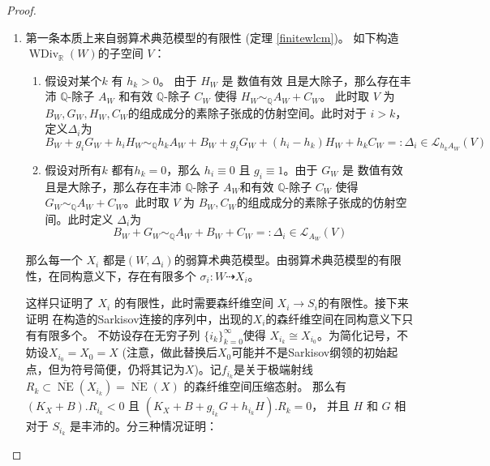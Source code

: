 \begin{proof}
  \begin{enumerate}
    \item 第一条本质上来自弱算术典范模型的有限性 (定理 \ref{finitewlcm})。  如下构造 $\operatorname{WDiv}_{\mathbb{R}}(W)$的子空间 $V$：
      \begin{enumerate}
        \item 假设对某个$k$ 有  $h_{k}>0$。 由于 $H_{W}$ 是 数值有效 且是大除子，那么存在丰沛 $\mathbb{Q}$-除子 $A_{W}$ 和有效 $\mathbb{Q}$-除子 $C_{W}$  使得 $H_{W}\sim_{\mathbb{Q}}A_{W}+C_{W}$。 此时取 $V$ 为  $B_{W},G_{W},H_{W},C_{W}$的组成成分的素除子张成的仿射空间。此时对于 $i>k$，定义$\Delta_{i}$为
              \[
                  B_{W}+g_{i}G_{W}+h_{i}H_{W}\sim_{\mathbb{Q}} h_{k}A_{W}+B_{W}+g_{i}G_{W}+(h_{i}-h_{k})H_{W}+h_{k}C_{W}=:\Delta_{i} \in \mathcal{L}_{h_{k}A_{W}}(V)
              \]
        \item 假设对所有$k$ 都有$h_{k}=0$，那么  $h_{i}\equiv 0$ 且 $g_{i}\equiv 1$。由于  $G_{W}$ 是 数值有效 且是大除子，那么存在丰沛 $\mathbb{Q}$-除子 $A_{W}$和有效 $\mathbb{Q}$-除子 $C_{W}$ 使得 $G_{W}\sim_{\mathbb{Q}}A_{W}+C_{W}$。此时取 $V$ 为  $B_{W},C_{W}$的组成成分的素除子张成的仿射空间。此时定义 $\Delta_{i}$为
              \[
                  B_{W}+G_{W}\sim_{\mathbb{Q}} A_{W}+B_{W}+C_{W}=:\Delta_{i} \in \mathcal{L}_{A_{W}}(V)
              \]
      \end{enumerate}
          那么每一个 $X_{i}$ 都是$(W,\Delta_{i})$的弱算术典范模型。由弱算术典范模型的有限性，在同构意义下，存在有限多个 $\sigma_{i}: W\dashrightarrow X_{i}$。

          这样只证明了 $X_{i}$ 的有限性，此时需要森纤维空间 $X_{i}\to S_{i}$的有限性。接下来证明 在构造的Sarkisov连接的序列中，出现的$X_{i}$的森纤维空间在同构意义下只有有限多个。
          不妨设存在无穷子列 $\{i_{k}\}_{k=0}^{\infty} $使得 $X_{i_{k}}\cong X_{i_{0}}$。为简化记号，不妨设$X_{i_{0}}=X_{0}=X$ (注意，做此替换后$X_{0}$可能并不是Sarkisov纲领的初始起点，但为符号简便，仍将其记为$X$)。记$f_{i_{k}}$是关于极端射线 $R_{k} \subset \overline{\operatorname{NE}}(X_{i_{k}})= \overline{\operatorname{NE}}(X) $ 的森纤维空间压缩态射。 那么有
          $(K_{X}+B).R_{i_{k}}<0  $ 且 $(K_{X}+B+g_{i_{k}}G+h_{i_{k}}H).R_{k}=0$， 并且 $H$ 和 $G$ 相对于 $S_{i_{k}}$ 是丰沛的。分三种情况证明：
      \begin{enumerate}


\end{enumerate}
\end{enumerate}
\end{proof}
